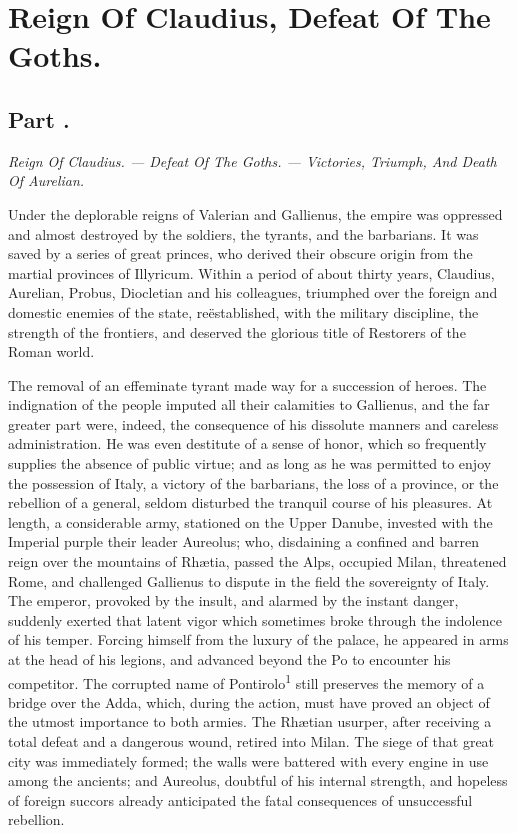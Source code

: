 \chapter{Reign Of Claudius, Defeat Of The Goths.}
\section{Part \thesection.}

\textit{Reign Of Claudius. — Defeat Of The Goths. — Victories, Triumph, And
Death Of Aurelian.}
\vspace{\onelineskip}

Under the deplorable reigns of Valerian and Gallienus, the empire
was oppressed and almost destroyed by the soldiers, the tyrants,
and the barbarians. It was saved by a series of great princes,
who derived their obscure origin from the martial provinces of
Illyricum. Within a period of about thirty years, Claudius,
Aurelian, Probus, Diocletian and his colleagues, triumphed over
the foreign and domestic enemies of the state, reëstablished,
with the military discipline, the strength of the frontiers, and
deserved the glorious title of Restorers of the Roman world.

The removal of an effeminate tyrant made way for a succession of
heroes. The indignation of the people imputed all their
calamities to Gallienus, and the far greater part were, indeed,
the consequence of his dissolute manners and careless
administration. He was even destitute of a sense of honor, which
so frequently supplies the absence of public virtue; and as long
as he was permitted to enjoy the possession of Italy, a victory
of the barbarians, the loss of a province, or the rebellion of a
general, seldom disturbed the tranquil course of his pleasures.
At length, a considerable army, stationed on the Upper Danube,
invested with the Imperial purple their leader Aureolus; who,
disdaining a confined and barren reign over the mountains of
Rhætia, passed the Alps, occupied Milan, threatened Rome, and
challenged Gallienus to dispute in the field the sovereignty of
Italy. The emperor, provoked by the insult, and alarmed by the
instant danger, suddenly exerted that latent vigor which
sometimes broke through the indolence of his temper. Forcing
himself from the luxury of the palace, he appeared in arms at the
head of his legions, and advanced beyond the Po to encounter his
competitor. The corrupted name of Pontirolo\textsuperscript{1} still preserves the
memory of a bridge over the Adda, which, during the action, must
have proved an object of the utmost importance to both armies.
The Rhætian usurper, after receiving a total defeat and a
dangerous wound, retired into Milan. The siege of that great city
was immediately formed; the walls were battered with every engine
in use among the ancients; and Aureolus, doubtful of his internal
strength, and hopeless of foreign succors already anticipated the
fatal consequences of unsuccessful rebellion.

